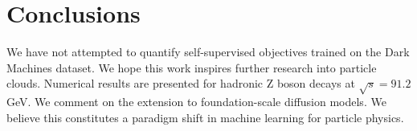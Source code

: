 \section{Conclusions}\label{sec:conclusions}

We have not attempted to quantify self-supervised objectives trained on
the Dark Machines dataset. We hope this work inspires further research
into particle clouds. Numerical results are presented for hadronic Z
boson decays at $\sqrt{s} = 91.2$ GeV. We comment on the extension to
foundation-scale diffusion models. We believe this constitutes a
paradigm shift in machine learning for particle physics.

